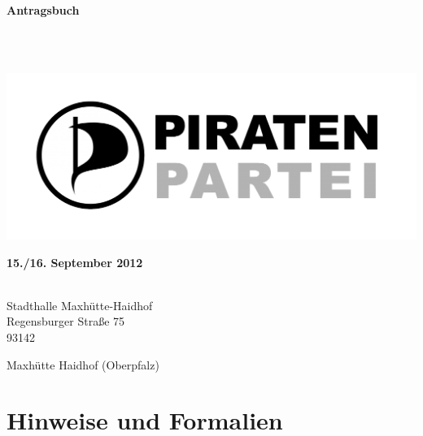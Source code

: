 \documentclass[12pt,a4paper,oneside]{scrbook}
\newcommand{\organ}{
Piratenpartei Deutschland Landesverband Bayern
}
\newcommand{\lpt}{
	Landesparteitag Bayern 2012.2
}
\newcommand{\datum}{
	15./16. September 2012
}
\newcommand{\halle}{
	Stadthalle Maxhütte-Haidhof
}
\newcommand{\strasse}{
	Regensburger Straße 75
}
\newcommand{\plz}{
	93142
}
\newcommand{\ort}{
	Maxhütte Haidhof (Oberpfalz)
}
\begin{document}

\pagestyle{empty}
\hypertarget{Titelseite}{} %
\begin{titlepage}
\begin{center}
\begin{Large}
\textsc{
\organ
}
\end{Large}
\vspace*{4cm}
\begin{Huge}
\textbf{
Antragsbuch
}
\end{Huge}
\\[.5cm]
\begin{huge}
\textbf{
\lpt
}
\end{huge}
\\[1cm]
\includegraphics[scale=.4]{media/LogoPrint.png}
\\[1cm]
\begin{Large}
\textbf{\datum}
\end{Large}
\\[1cm]
\halle \\
\strasse \\
\plz \ort
\end{center}
\end{titlepage}
\clearpage


\tableofcontents
\newpage
\pagestyle{plain}


\chapter{Hinweise und Formalien}






\end{document}
